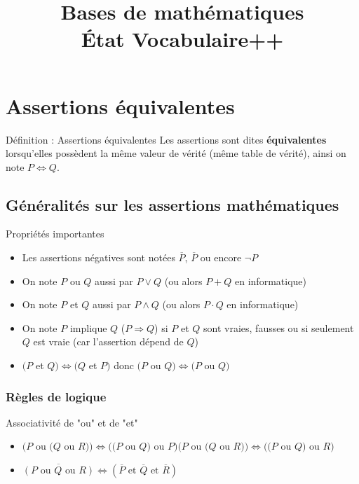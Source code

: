 \documentclass[a4paper,11pt]{article}
\title{\textbf{Bases de mathématiques} \\ État Vocabulaire++}
\author{}
\date{}
\begin{document}
\maketitle
\tableofcontents
\newpage

\section{Assertions équivalentes}

\begin{defbox}{Définition : Assertions équivalentes}
Les assertions sont dites \textbf{équivalentes} lorsqu'elles possèdent la même valeur de vérité (même table de vérité), ainsi on note $P \Leftrightarrow Q$.
\end{defbox}

\subsection{Généralités sur les assertions mathématiques}

\begin{propbox}{Propriétés importantes}
\begin{itemize}
    \item Les assertions négatives sont notées $\overline{P}$, $\overline{P}$ ou encore $\neg P$
    \item On note $P$ ou $Q$ aussi par $P \vee Q$ (ou alors $P + Q$ en informatique)
    \item On note $P$ et $Q$ aussi par $P \wedge Q$ (ou alors $P \cdot Q$ en informatique)
    \item On note $P$ implique $Q$ ($P \Rightarrow Q$) si $P$ et $Q$ sont vraies, fausses ou si seulement $Q$ est vraie (car l'assertion dépend de $Q$)
    \item $(P$ et $Q) \Leftrightarrow (Q$ et $P)$ donc $(P$ ou $Q) \Leftrightarrow (P$ ou $Q)$
\end{itemize}
\end{propbox}

\subsubsection{Règles de logique}

\begin{propbox}{Associativité de "ou" et de "et"}
\begin{itemize}
    \item $(P$ ou $(Q$ ou $R)) \Leftrightarrow ((P$ ou $Q)$ ou $P) (P$ ou $(Q$ ou $R)) \Leftrightarrow ((P$ ou $Q)$ ou $R)$
    \item $\overline{(P \text{ ou } Q \text{ ou } R)} \Leftrightarrow (\overline{P} \text{ et } \overline{Q} \text{ et } \overline{R})$
\end{itemize}
\end{propbox}
\end{document}
